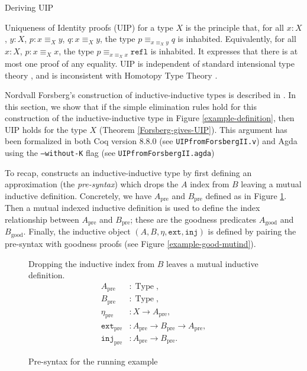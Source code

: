 \documentclass[runningheads]{llncs}
\DeclareMathOperator{\USet}{Type}
\newcommand{\pre}[1]{{#1}_\text{pre}}
\newcommand{\good}[1]{{#1}_\text{good}}
\newcommand{\IdA}[3]{{#1}\equiv_{#3}{#2}}
\newcommand{\join}{\texttt{ext}}
\newcommand{\inj}{\texttt{inj}}
\newcommand{\refl}{\texttt{refl}}
\def\Forsberg/{Nordvall Forsberg}
\begin{document}
\begin{section}{Deriving UIP}\label{derivingUIP}

Uniqueness of Identity proofs (UIP) for a type $X$ is the principle that, for all $x : X$, $y : X$, $p : \IdA{x}{y}{X}$, $q : \IdA{x}{y}{X}$, the type $\IdA{p}{q}{\IdA{x}{y}{X}}$ is inhabited. Equivalently, for all $x : X$, $p : \IdA{x}{x}{X}$, the type $\IdA{p}{\refl}{\IdA{x}{x}{X}}$ is inhabited. It expresses that there is at most one proof of any equality. UIP is independent of standard intensional type theory \citep{groupoidmodel}, and is inconsistent with Homotopy Type Theory \citep{hottbook}.

\Forsberg/'s construction of inductive-inductive types is described in \citep[\S5.3]{nordvallforsberg2013thesis}. In this section, we show that if the simple elimination rules hold for this construction of the inductive-inductive type in Figure \ref{example-definition}, then UIP holds for the type $X$ (Theorem \ref{Forsberg-gives-UIP}).
This argument has been formalized in both Coq version 8.8.0 \citep{Coq880} (see \texttt{UIP\textunderscore{}from\textunderscore{}Forsberg\textunderscore{}II.v}) and Agda using the \texttt{--without-K} flag (see \texttt{UIP\textunderscore{}from\textunderscore{}Forsberg\textunderscore{}II.agda})

To recap, \citet[\S5.3]{nordvallforsberg2013thesis} constructs an inductive-inductive type by first defining an approximation (the \emph{pre-syntax}) which drops the $A$ index from $B$ leaving a mutual inductive definition. Concretely, we have $\pre{A}$ and $\pre{B}$ defined as in Figure \ref{example-pre-syntax}. Then a mutual indexed inductive definition is used to define the index relationship between $\pre{A}$ and $\pre{B}$; these are the goodness predicates $\good{A}$ and $\good{B}$. Finally, the inductive object $(A, B, \eta, \join, \inj)$ is defined by pairing the pre-syntax with goodness proofs (see Figure \ref{example-good-mutind}).

\begin{figure}[htpb]
    \begin{flushleft}
        Dropping the inductive index from $B$ leaves a mutual inductive definition.
        \begin{align*}
        \pre{A}&:\USet,\\
        \pre{B}&:\USet,\\
        \pre{\eta}&:X\to\pre{A},\\
        \pre{\join}&:\pre{A}\to\pre{B}\to\pre{A},\\
        \pre{\inj}&:\pre{A}\to\pre{B}.
        \end{align*}
    \end{flushleft}
    \caption{\label{example-pre-syntax}Pre-syntax for the running example}
\end{figure}


\end{section}
\end{document}
